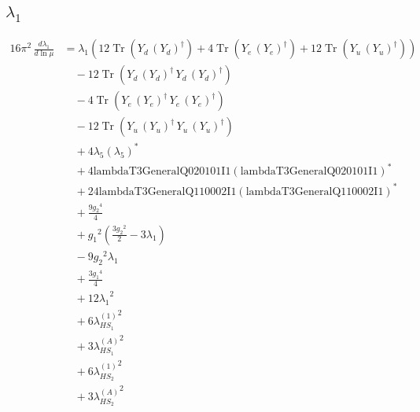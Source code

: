 \documentclass[10pt,a4paper]{article}
\begin{document}
\subsection*{$\lambda_1$}
\begin{align*}
16\pi^2\,\frac{d \lambda_1}{d\ln\mu} &={\lambda_1} (12 \operatorname{Tr}\!\left({Y_d}\,\left({Y_d}\right)^{\dagger}\right)+4 \operatorname{Tr}\!\left({Y_e}\,\left({Y_e}\right)^{\dagger}\right)+12 \operatorname{Tr}\!\left({Y_u}\,\left({Y_u}\right)^{\dagger}\right)) \\
&\quad -12 \operatorname{Tr}\!\left({Y_d}\,\left({Y_d}\right)^{\dagger}\,{Y_d}\,\left({Y_d}\right)^{\dagger}\right) \\
&\quad -4 \operatorname{Tr}\!\left({Y_e}\,\left({Y_e}\right)^{\dagger}\,{Y_e}\,\left({Y_e}\right)^{\dagger}\right) \\
&\quad -12 \operatorname{Tr}\!\left({Y_u}\,\left({Y_u}\right)^{\dagger}\,{Y_u}\,\left({Y_u}\right)^{\dagger}\right) \\
&\quad +4 {\lambda_5} \left({\lambda_5}\right)^{*} \\
&\quad +4 \text{lambdaT3GeneralQ020101I1} \left(\text{lambdaT3GeneralQ020101I1}\right)^{*} \\
&\quad +24 \text{lambdaT3GeneralQ110002I1} \left(\text{lambdaT3GeneralQ110002I1}\right)^{*} \\
&\quad +\frac{9 {g_2}^4}{4} \\
&\quad +{g_1}^2 \left(\frac{3 {g_2}^2}{2}-3 {\lambda_1}\right) \\
&\quad -9 {g_2}^2 {\lambda_1} \\
&\quad +\frac{3 {g_1}^4}{4} \\
&\quad +12 {\lambda_1}^2 \\
&\quad +6 {\lambda_{HS_1}^{(1)}}^2 \\
&\quad +3 {\lambda_{HS_1}^{(A)}}^2 \\
&\quad +6 {\lambda_{HS_2}^{(1)}}^2 \\
&\quad +3 {\lambda_{HS_2}^{(A)}}^2 \\
\end{align*}
\end{document}
